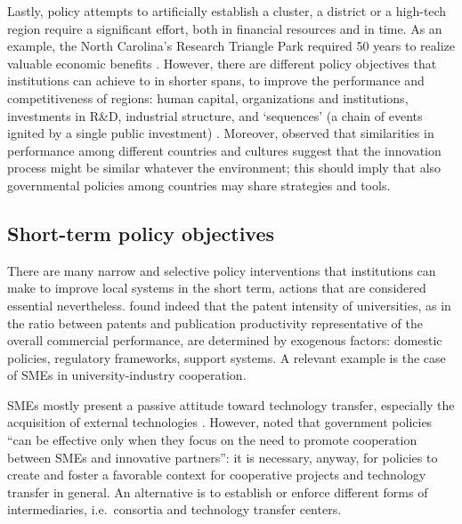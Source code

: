Lastly, policy attempts to artificially establish a cluster, a district or a high-tech region require a significant effort, both in financial resources and in time. As an example, the North Carolina's Research Triangle Park required 50 years to realize valuable economic benefits \citep{Bercovitz2006}. However, there are different policy objectives that institutions can achieve to in shorter spans, to improve the performance and competitiveness of regions: human capital, organizations and institutions, investments in R\&D, industrial structure, and ‘sequences' (a chain of events ignited by a single public investment) \citep{Niosi2002}. Moreover, \citet{Heher2006} observed that similarities in performance among different countries and cultures suggest that the innovation process might be similar whatever the environment; this should imply that also governmental policies among countries may share strategies and tools.  

\subsection{Short-term policy objectives}

There are many narrow and selective policy interventions that institutions can make to improve local systems in the short term, actions that are considered essential nevertheless. \citet{Tijssen2006} found indeed that the patent intensity of universities, as in the ratio between patents and publication productivity representative of the overall commercial performance, are determined by exogenous factors: domestic policies, regulatory frameworks, support systems. A relevant example is the case of SMEs in university-industry cooperation.

SMEs mostly present a passive attitude toward technology transfer, especially the acquisition of external technologies \citep{Yusuf2008}. However, \citet{Zeng2010} noted that government policies \enquote{can be effective only when they focus on the need to promote cooperation between SMEs and innovative partners}: it is necessary, anyway, for policies to create and foster a favorable context for cooperative projects and technology transfer in general. An alternative is to establish or enforce different forms of intermediaries, i.e.\ consortia and technology transfer centers. 

